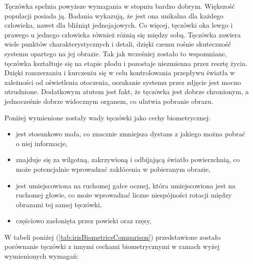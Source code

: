 Tęczówka spełnia powyższe wymagania w stopniu bardzo dobrym. Większoś\'c populacji posiada
ją. Badania wykazują, że jest ona unikalna dla każdego człowieka, nawet dla bli\'zniąt jednojajowych.
Co więcej, tęczówki oka lewgo i prawego u jednego człowieka również różnią się między sobą. Tęczówka zawiera
wiele punktów charakterystycznych i detali, dzięki czemu rośnie skutecznoś\'c systemu opartego na jej obrazie.
Tak jak wcześniej zostało to wspomniane, tęczówka kształtuje się na etapie płodu i pozostaje niezmienna
przez resztę życia. Dzięki rozszerzaniu i kurczeniu się w celu kontrolowania przepływu światła w zależności
od oświetlenia otoczenia, oszukanie systemu przez zdjęcie jest mocno utrudnione. Dodatkowym atutem
jest fakt, że tęczówka jest dobrze chronionym, a jednocześnie dobrze widocznym organem, co ułatwia
pobranie obrazu.\newline

\noindent
Poniżej wymienione zostały wady tęczówki jako cechy biometrycznej:

\begin{itemize}
  \item jest stosunkowo mała, co znacznie zmniejsza dystans z jakiego można pobra\'c o niej informacje,
  \item znajduje się za wilgotną, zakrzywioną i odbijającą światło powierzchnią, co może potencjalnie
  wprowadza\'c zakłócenia w pobieranym obrazie,
  \item jest umiejscowiona na ruchomej gałce ocznej, która umiejscowiona jest na ruchomej głowie, co może
  wprowadza\'c liczne niespójności rotacji między obrazami tej samej tęczówki,
  \item częściowo zasłonięta przez powieki oraz rzęsy,
\end{itemize}

W tabeli poniżej (\ref{tab:irisBiometricsComparison}) przedstawione zostało porównanie tęczówki
z innymi cechami biometrycznymi w ramach wyżej wymienionych wymagań:


